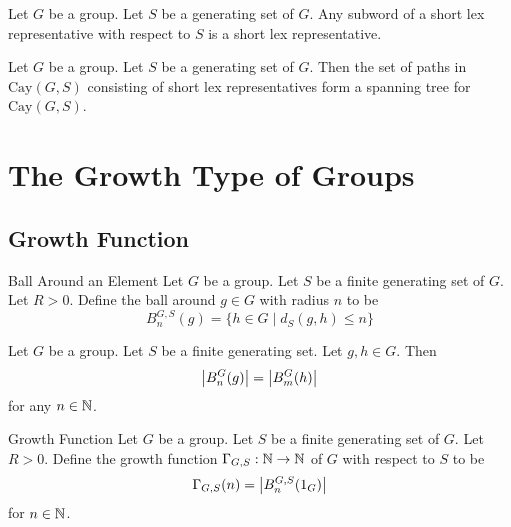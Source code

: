 \documentclass[a4paper]{article}
\begin{document}
\begin{lmm}{}{} Let $G$ be a group. Let $S$ be a generating set of $G$. Any subword of a short lex representative with respect to $S$ is a short lex representative. 
\end{lmm}

\begin{crl}{}{} Let $G$ be a group. Let $S$ be a generating set of $G$. Then the set of paths in $\text{Cay}(G,S)$ consisting of short lex representatives form a spanning tree for $\text{Cay}(G,S)$. 
\end{crl}

\pagebreak
\section{The Growth Type of Groups}
\subsection{Growth Function}
\begin{defn}{Ball Around an Element}{} Let $G$ be a group. Let $S$ be a finite generating set of $G$. Let $R>0$. Define the ball around $g\in G$ with radius $n$ to be $$B_n^{G,S}(g)=\{h\in G\;|\;d_S(g,h)\leq n\}$$
\end{defn}

\begin{prp}{}{} Let $G$ be a group. Let $S$ be a finite generating set. Let $g,h\in G$. Then $$\abs{B_n^G(g)}=\abs{B_m^G(h)}$$ for any $n\in\mathbb{N}$. 
\end{prp}

\begin{defn}{Growth Function}{} Let $G$ be a group. Let $S$ be a finite generating set of $G$. Let $R>0$. Define the growth function $\Gamma_{G,S}:\mathbb{N}\to\mathbb{N}$ of $G$ with respect to $S$ to be $$\Gamma_{G,S}(n)=\abs{B_n^{G,S}(1_G)}$$ for $n\in\mathbb{N}$. 
\end{defn}
\end{document}
